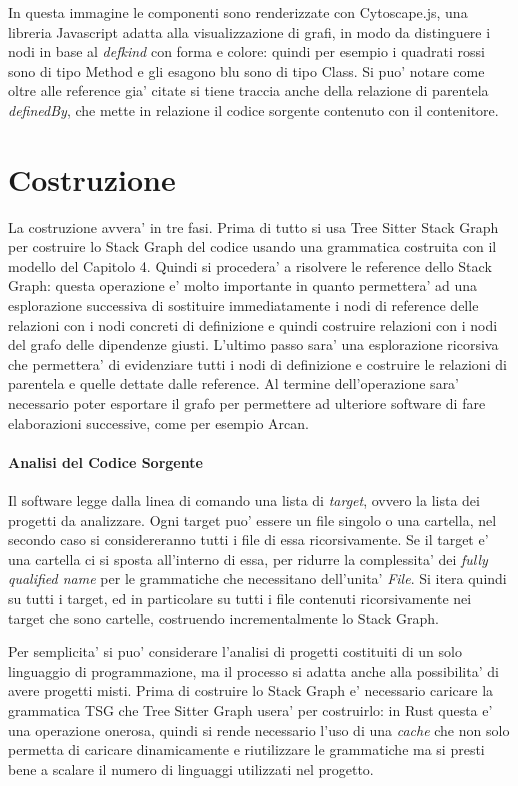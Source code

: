 In questa immagine le componenti sono renderizzate con Cytoscape.js, una libreria Javascript adatta alla visualizzazione di grafi, in modo da distinguere i nodi in base al \emph{defkind} con forma e colore: quindi per esempio i quadrati rossi sono di tipo Method e gli esagono blu sono di tipo Class.
Si puo' notare come oltre alle reference gia' citate si tiene traccia anche della relazione di parentela \emph{definedBy}, che mette in relazione il codice sorgente contenuto con il contenitore.

\section{Costruzione}

La costruzione avvera' in tre fasi.
Prima di tutto si usa Tree Sitter Stack Graph per costruire lo Stack Graph del codice usando una grammatica costruita con il modello del Capitolo 4.
Quindi si procedera' a risolvere le reference dello Stack Graph: questa operazione e' molto importante in quanto permettera' ad una esplorazione successiva di sostituire immediatamente i nodi di reference delle relazioni con i nodi concreti di definizione e quindi costruire relazioni con i nodi del grafo delle dipendenze giusti.
L'ultimo passo sara' una esplorazione ricorsiva che permettera' di evidenziare tutti i nodi di definizione e costruire le relazioni di parentela e quelle dettate dalle reference.
Al termine dell'operazione sara' necessario poter esportare il grafo per permettere ad ulteriore software di fare elaborazioni successive, come per esempio Arcan.

\paragraph{Analisi del Codice Sorgente}

Il software legge dalla linea di comando una lista di \emph{target}, ovvero la lista dei progetti da analizzare.
Ogni target puo' essere un file singolo o una cartella, nel secondo caso si considereranno tutti i file di essa ricorsivamente. Se il target e' una cartella ci si sposta all'interno di essa, per ridurre la complessita' dei \emph{fully qualified name} per le grammatiche che necessitano dell'unita' \emph{File}.
Si itera quindi su tutti i target, ed in particolare su tutti i file contenuti ricorsivamente nei target che sono cartelle, costruendo incrementalmente lo Stack Graph.

Per semplicita' si puo' considerare l'analisi di progetti costituiti di un solo linguaggio di programmazione, ma il processo si adatta anche alla possibilita' di avere progetti misti. Prima di costruire lo Stack Graph e' necessario caricare la grammatica TSG che Tree Sitter Graph usera' per costruirlo: in Rust questa e' una operazione onerosa, quindi si rende necessario l'uso di una \emph{cache} che non solo permetta di caricare dinamicamente e riutilizzare le grammatiche ma si presti bene a scalare il numero di linguaggi utilizzati nel progetto.

